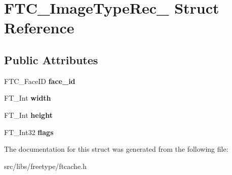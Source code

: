 \hypertarget{struct_f_t_c___image_type_rec__}{
\section{FTC\_\-ImageTypeRec\_\- Struct Reference}
\label{struct_f_t_c___image_type_rec__}
}
\subsection*{Public Attributes}
\begin{DoxyCompactItemize}
\item 
\hypertarget{struct_f_t_c___image_type_rec___a9851b8d4a06baacd18d5b9856fd85abd}{
FTC\_\-FaceID {\bfseries face\_\-id}}
\label{struct_f_t_c___image_type_rec___a9851b8d4a06baacd18d5b9856fd85abd}

\item 
\hypertarget{struct_f_t_c___image_type_rec___af1a4cccbabb0f5852ed755a12ed08dd8}{
FT\_\-Int {\bfseries width}}
\label{struct_f_t_c___image_type_rec___af1a4cccbabb0f5852ed755a12ed08dd8}

\item 
\hypertarget{struct_f_t_c___image_type_rec___adb56a9d18a3f522d713d0ba01c1a8778}{
FT\_\-Int {\bfseries height}}
\label{struct_f_t_c___image_type_rec___adb56a9d18a3f522d713d0ba01c1a8778}

\item 
\hypertarget{struct_f_t_c___image_type_rec___a391782ed8c67de86591c71f276ea6454}{
FT\_\-Int32 {\bfseries flags}}
\label{struct_f_t_c___image_type_rec___a391782ed8c67de86591c71f276ea6454}

\end{DoxyCompactItemize}


The documentation for this struct was generated from the following file:\begin{DoxyCompactItemize}
\item 
src/libs/freetype/ftcache.h\end{DoxyCompactItemize}
